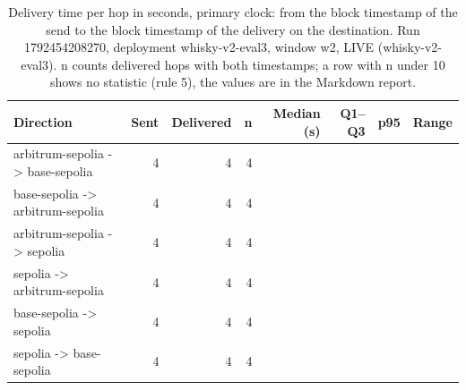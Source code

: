 \begin{table}[htbp]
    \centering
    \small
    \begin{tabular}{lrrrrrrr}
    \toprule
    Direction & Sent & Delivered & n & Median (s) & Q1--Q3 & p95 & Range \\
    \midrule
    arbitrum-sepolia -> base-sepolia & 4 & 4 & 4 &  &  &  &  \\
    base-sepolia -> arbitrum-sepolia & 4 & 4 & 4 &  &  &  &  \\
    arbitrum-sepolia -> sepolia & 4 & 4 & 4 &  &  &  &  \\
    sepolia -> arbitrum-sepolia & 4 & 4 & 4 &  &  &  &  \\
    base-sepolia -> sepolia & 4 & 4 & 4 &  &  &  &  \\
    sepolia -> base-sepolia & 4 & 4 & 4 &  &  &  &  \\
    \bottomrule
    \end{tabular}
    \caption{Delivery time per hop in seconds, primary clock: from the block timestamp of the send to the block timestamp of the delivery on the destination. Run 1792454208270, deployment whisky-v2-eval3, window w2, LIVE (whisky-v2-eval3). n counts delivered hops with both timestamps; a row with n under 10 shows no statistic (rule 5), the values are in the Markdown report.}
    \label{tab:delivery-latency-1792454208270}
\end{table}

